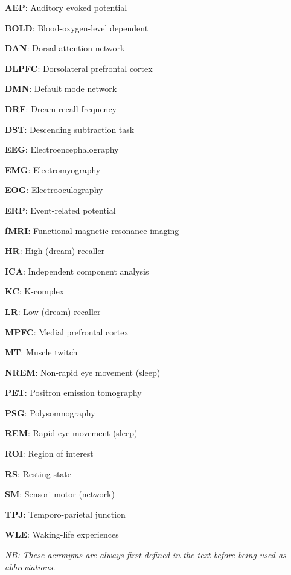 \label{sec:acronyms}
\vspace*{-10mm}
\setlength{\columnsep}{1.25cm}
\begin{multicols}{2}

\textbf{AEP}: Auditory evoked potential

\textbf{BOLD}: Blood-oxygen-level dependent

\textbf{DAN}: Dorsal attention network

\textbf{DLPFC}: Dorsolateral prefrontal cortex

\textbf{DMN}: Default mode network

\textbf{DRF}: Dream recall frequency

\textbf{DST}: Descending subtraction task

\textbf{EEG}: Electroencephalography

\textbf{EMG}: Electromyography

\textbf{EOG}: Electrooculography

\textbf{ERP}: Event-related potential

\textbf{fMRI}: Functional magnetic resonance imaging

\textbf{HR}: High-(dream)-recaller

\textbf{ICA}: Independent component analysis

\textbf{KC}: K-complex

\textbf{LR}: Low-(dream)-recaller

\textbf{MPFC}: Medial prefrontal cortex

\textbf{MT}: Muscle twitch

\textbf{NREM}: Non-rapid eye movement (sleep)

\textbf{PET}: Positron emission tomography

\textbf{PSG}: Polysomnography

\textbf{REM}: Rapid eye movement (sleep)

\textbf{ROI}: Region of interest

\textbf{RS}: Resting-state

\textbf{SM}: Sensori-motor (network)

\textbf{TPJ}: Temporo-parietal junction

\textbf{WLE}: Waking-life experiences
\end{multicols}

\textit{NB: These acronyms are always first defined in the text before being used as abbreviations.}
